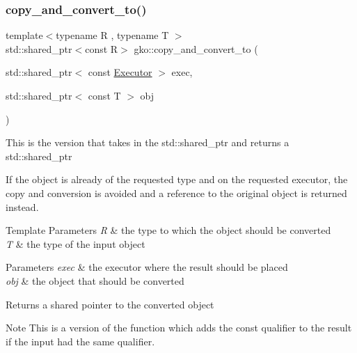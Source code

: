 \subsubsection{\texorpdfstring{copy\+\_\+and\+\_\+convert\+\_\+to()}{copy\_and\_convert\_to()}\hspace{0.1cm}{\footnotesize\ttfamily [4/4]}}
{\footnotesize\ttfamily template$<$typename R , typename T $>$ \\
std\+::shared\+\_\+ptr$<$const R$>$ gko\+::copy\+\_\+and\+\_\+convert\+\_\+to (\begin{DoxyParamCaption}\item[{std\+::shared\+\_\+ptr$<$ const \hyperlink{classgko_1_1Executor}{Executor} $>$}]{exec,  }\item[{std\+::shared\+\_\+ptr$<$ const T $>$}]{obj }\end{DoxyParamCaption})}





This is the version that takes in the std\+::shared\+\_\+ptr and returns a std\+::shared\+\_\+ptr

If the object is already of the requested type and on the requested executor, the copy and conversion is avoided and a reference to the original object is returned instead.


\begin{DoxyTemplParams}{Template Parameters}
{\em R} & the type to which the object should be converted \\
\hline
{\em T} & the type of the input object\\
\hline
\end{DoxyTemplParams}

\begin{DoxyParams}{Parameters}
{\em exec} & the executor where the result should be placed \\
\hline
{\em obj} & the object that should be converted\\
\hline
\end{DoxyParams}
\begin{DoxyReturn}{Returns}
a shared pointer to the converted object
\end{DoxyReturn}
\begin{DoxyNote}{Note}
This is a version of the function which adds the const qualifier to the result if the input had the same qualifier. 
\end{DoxyNote}
\mbox{\label{namespacegko_a4eea40e4123a3fdb60fcd92f902c6d6d}} 

